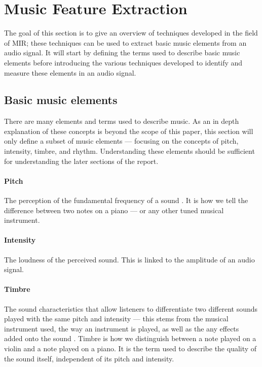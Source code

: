 \documentclass[../initial_thesis.tex]{subfiles}
\begin{document}
\section{Music Feature Extraction}\label{sec:mir}
The goal of this section is to give an overview of techniques developed in the field of MIR; these techniques can be used to extract basic music elements from an audio signal. It will start by defining the terms used to describe basic music elements before introducing the various techniques developed to identify and measure these elements in an audio signal.

\subsection{Basic music elements}
There are many elements and terms used to describe music. As an in depth explanation of these concepts is beyond the scope of this paper, this section will only define a subset of music elements --- focusing on the concepts of pitch, intensity, timbre, and rhythm. Understanding these elements should be sufficient for understanding the later sections of the report.

\paragraph{Pitch} The perception of the fundamental frequency of a sound \cite{Orio2006}. It is how we tell the difference between two notes on a piano --- or any other tuned musical instrument.

\paragraph{Intensity} The loudness of the perceived sound. This is linked to the amplitude of an audio signal.

\paragraph{Timbre} The sound characteristics that allow listeners to differentiate two different sounds played with the same pitch and intensity --- this stems from the musical instrument used, the way an instrument is played, as well as the any effects added onto the sound \cite{Orio2006}. Timbre is how we distinguish between a note played on a violin and a note played on a piano. It is the term used to describe the quality of the sound itself, independent of its pitch and intensity.
\end{document}
